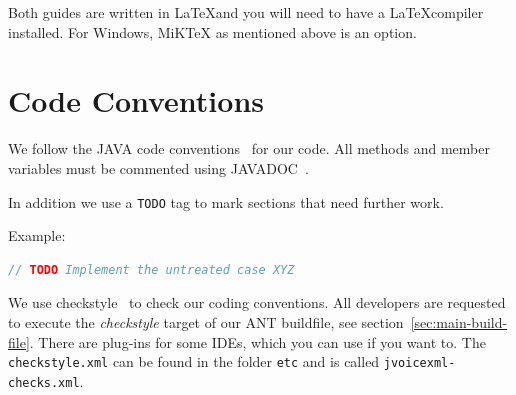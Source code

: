 \documentclass[11pt,a4paper]{article}
\begin{document}
Both guides are written in \LaTeX and you will need to have a \LaTeX compiler
installed. For Windows, MiKTeX as mentioned above is an option.


\section{Code Conventions}
\label{sec:code-conventions}

We follow the JAVA code conventions~\cite{sun:codeconv} for our code. All
methods and member variables must be commented using 
JAVADOC~\cite{sun:javadoc_guidelines}.

In addition we use a \texttt{TODO} tag to mark sections that need further work.

Example:

\begin{lstlisting}[language=Java]
// TODO Implement the untreated case XYZ
\end{lstlisting}

We use checkstyle~\cite{checkstyle} to check our coding conventions.
All developers are requested to execute the \emph{checkstyle} target
of our ANT buildfile, see section~\ref{sec:main-build-file}. 
There are plug-ins for some IDEs, which you can use if you want to. The
\texttt{checkstyle.xml} can be found in the folder 
\texttt{etc} and is called \texttt{jvoicexml-checks.xml}.
\end{document}
